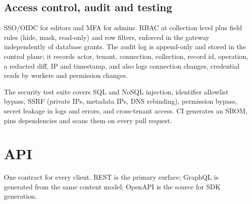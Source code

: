 \documentclass[11pt,a4paper]{article}
\begin{document}
\subsection{Access control, audit and testing}
SSO/OIDC for editors and MFA for admins. RBAC at collection level plus field rules (hide, mask, read-only) and row filters, enforced in the gateway independently of database grants. The audit log is append-only and stored in the control plane; it records actor, tenant, connection, collection, record id, operation, a redacted diff, IP and timestamp, and also logs connection changes, credential reads by workers and permission changes.

The security test suite covers SQL and NoSQL injection, identifier allowlist bypass, SSRF (private IPs, metadata IPs, DNS rebinding), permission bypass, secret leakage in logs and errors, and cross-tenant access. CI generates an SBOM, pins dependencies and scans them on every pull request.

\section{API}
One contract for every client. REST is the primary surface; GraphQL is generated from the same content model; OpenAPI is the source for SDK generation.
\end{document}
